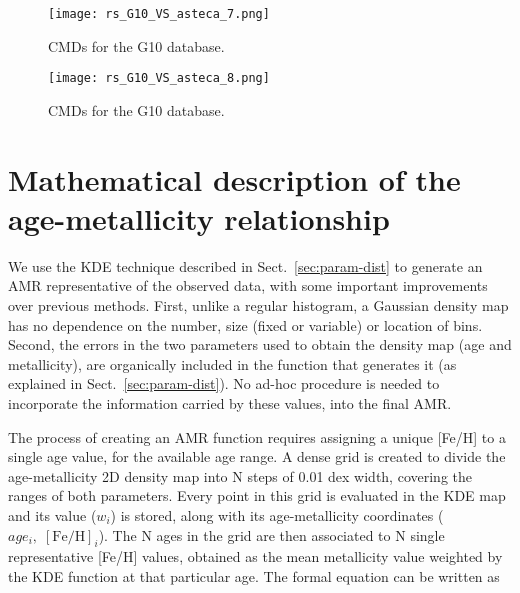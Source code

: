 \documentclass{aa}
\begin{document}
\begin{appendix}
\begin{figure*}
\texttt{[image: rs\_G10\_VS\_asteca\_7.png]}
\caption{CMDs for the G10 database.}
\label{fig:DBs_G10_7}
\end{figure*}
\clearpage

\begin{figure}
\centering
\texttt{[image: rs\_G10\_VS\_asteca\_8.png]}
\caption{CMDs for the G10 database.}
\label{fig:DBs_G10_8}
\end{figure}





\section{Mathematical description of the age-metallicity relationship}
\label{apdx:amr_description}

We use the KDE technique described in Sect.~\ref{sec:param-dist} to
generate an AMR representative of the observed data, with some important
improvements over previous methods.
%
First, unlike a regular histogram, a Gaussian density map has no dependence on
the number, size (fixed or variable) or location of bins.
Second, the errors in the two parameters used to obtain the density map (age and
metallicity), are organically included in the function that generates it
(as explained in Sect.~\ref{sec:param-dist}). No ad-hoc procedure is needed to
incorporate the information carried by these values, into the final AMR.\@

The process of creating an AMR function
requires assigning a unique [Fe/H] to a single age value, for the available age
range.
%
A dense grid is created to divide the age-metallicity 2D density map into N
steps of 0.01 dex width, covering the ranges of both parameters. Every point in
this grid is evaluated in the KDE map and its value ($w_{i}$) is stored, along
with its age-metallicity coordinates ($age_{i},\;[\mathrm{Fe/H}]_{i}$).
%
The N ages in the grid are then associated to N single representative [Fe/H]
values, obtained as the mean metallicity value weighted by the KDE function at
that particular age. The formal equation can be written as


\end{appendix}
\end{document}
